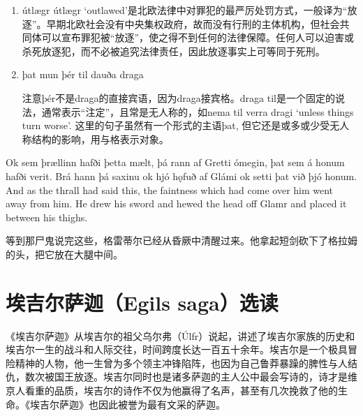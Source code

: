 \begin{grammar*}{}
  \begin{enumerate}[leftmargin=*]
    \item útlægr
          útlægr `outlawed'是北欧法律中对罪犯的最严厉处罚方式，一般译为“放逐”。早期北欧社会没有中央集权政府，故而没有行刑的主体机构，但社会共同体可以宣布罪犯被“放逐”，使之得不到任何的法律保障。任何人可以迫害或杀死放逐犯，而不必被追究法律责任，因此放逐事实上可等同于死刑。
    \item þat mun þér til dauða draga

          注意þér不是draga的直接宾语，因为draga接宾格。draga til是一个固定的说法，通常表示“注定”，且常是无人称的，如nema til verra dragi `unless things turn worse'. 这里的句子虽然有一个形式的主语þat, 但它还是或多或少受无人称结构的影响，用与格表示对象。
  \end{enumerate}
\end{grammar*}
\begin{paracol}{2}
  Ok sem þrællinn hafði þetta mælt, þá rann af Gretti ómegin, þat sem á honum hafði verit. Brá hann þá saxinu ok hjó hǫfuð af Glámi ok setti þat við þjó honum.
  \switchcolumn
  And as the thrall had said this, the faintness which had come over him went away from him. He drew his sword and hewed the head off Glamr and placed it between his thighs.
\end{paracol}
\begin{translation*}{}
  等到那尸鬼说完这些，格雷蒂尔已经从昏厥中清醒过来。他拿起短剑砍下了格拉姆的头，把它放在大腿中间。
\end{translation*}

\section{埃吉尔萨迦（Egils saga）选读}
《埃吉尔萨迦》从埃吉尔的祖父乌尔弗（Úlfr）说起，讲述了埃吉尔家族的历史和埃吉尔一生的战斗和人际交往，时间跨度长达一百五十余年。埃吉尔是一个极具冒险精神的人物，他一生曾为多个领主冲锋陷阵，也因为自己鲁莽暴躁的脾性与人结仇，数次被国王放逐。埃吉尔同时也是诸多萨迦的主人公中最会写诗的，诗才是维京人看重的品质，埃吉尔的诗作不仅为他赢得了名声，甚至有几次挽救了他的生命。《埃吉尔萨迦》也因此被誉为最有文采的萨迦。


